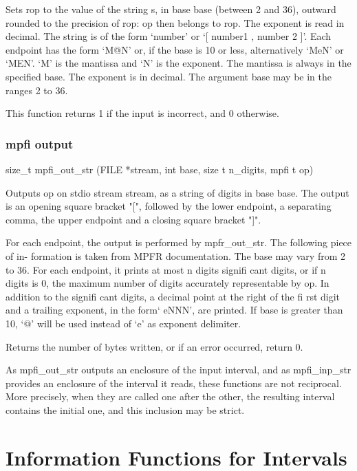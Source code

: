 Sets rop to the value of the string s, in base base (between 2 and 36), outward rounded to
the precision of rop: op then belongs to rop. The exponent is read in decimal. The string
is of the form ‘number’ or ‘[ number1 , number 2 ]’. Each endpoint has the form ‘M@N’ or, if
the base is 10 or less, alternatively ‘MeN’ or ‘MEN’. ‘M’ is the mantissa and ‘N’ is the exponent.
The mantissa is always in the specified base. The exponent is in decimal. The argument base
may be in the ranges 2 to 36.

This function returns 1 if the input is incorrect, and 0 otherwise.




\subsubsection{mpfi output}
size\_t mpfi\_out\_str (FILE *stream, int base, size t n\_digits, mpfi t op)

Outputs op on stdio stream stream, as a string of digits in base base. The output is an
opening square bracket "[", followed by the lower endpoint, a separating comma, the upper
endpoint and a closing square bracket "]".

For each endpoint, the output is performed by mpfr\_out\_str. The following piece of in-
formation is taken from MPFR documentation. The base may vary from 2 to 36. For each
endpoint, it prints at most n digits signifi cant digits, or if n digits is 0, the maximum number
of digits accurately representable by op. In addition to the signifi cant digits, a decimal point
at the right of the fi rst digit and a trailing exponent, in the form‘ eNNN’, are printed. If base
is greater than 10, ‘@’ will be used instead of ‘e’ as exponent delimiter.

Returns the number of bytes written, or if an error occurred, return 0.

As mpfi\_out\_str outputs an enclosure of the input interval, and as mpfi\_inp\_str provides
an enclosure of the interval it reads, these functions are not reciprocal. More precisely, when
they are called one after the other, the resulting interval contains the initial one, and this
inclusion may be strict.



\section{Information Functions for Intervals}
\label{InformationFunctionsForIntervals}



